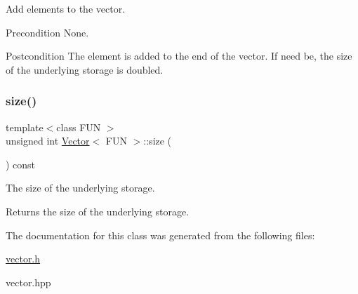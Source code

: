 Add elements to the vector. 

\begin{DoxyPrecond}{Precondition}
None. 
\end{DoxyPrecond}
\begin{DoxyPostcond}{Postcondition}
The element is added to the end of the vector. If need be, the size of the underlying storage is doubled. 
\end{DoxyPostcond}
\mbox{\label{classVector_a21b80c989eadd6dfa49f2c01e53abd35}} 
\subsubsection{\texorpdfstring{size()}{size()}}
{\footnotesize\ttfamily template$<$class F\+UN $>$ \\
unsigned int \hyperlink{classVector}{Vector}$<$ F\+UN $>$\+::size (\begin{DoxyParamCaption}{ }\end{DoxyParamCaption}) const}



The size of the underlying storage. 

\begin{DoxyReturn}{Returns}
the size of the underlying storage. 
\end{DoxyReturn}


The documentation for this class was generated from the following files\+:\begin{DoxyCompactItemize}
\item 
\hyperlink{vector_8h}{vector.\+h}\item 
vector.\+hpp\end{DoxyCompactItemize}
